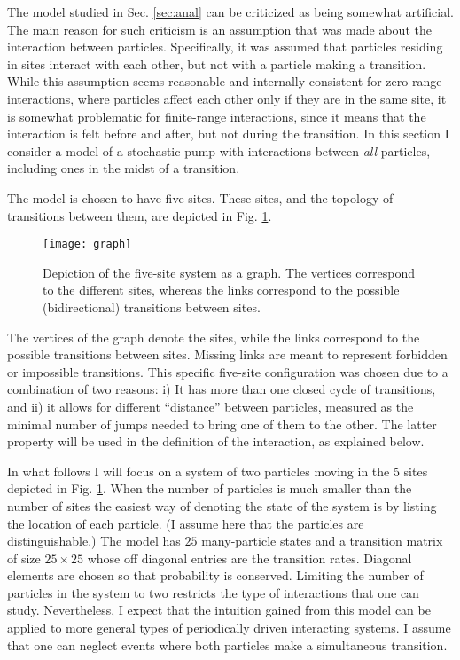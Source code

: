 \documentclass[aps,pre,showpacs,amsmath,amssymb,amsfonts,superscriptaddress,onecolumn,longbibliography]{revtex4-1}
\begin{document}
The model studied in Sec. \ref{sec:anal}
can be criticized as being somewhat artificial. The main reason for such criticism is an assumption
that was
made about the interaction between particles. Specifically, it was assumed that particles residing in sites interact with
each other, but not with a particle making a transition. While this assumption seems
 reasonable and internally consistent for zero-range interactions, where particles affect each other only if they are
 in the same site,
 it is somewhat problematic for finite-range interactions, since
 it means that the interaction is felt before and after, but not during the transition.
  In this section
I consider a model of a stochastic pump with interactions between {\em all} particles, including ones in the midst
of a transition.

The model is chosen to have five sites. These sites, and the topology of transitions between them, are depicted in Fig. \ref{fig:graph}.
\begin{figure}
\texttt{[image: graph]}

\caption{Depiction of the five-site system as a graph. The vertices correspond to the different sites, whereas the links correspond to the possible (bidirectional) transitions between sites. \label{fig:graph}}
\end{figure}
The vertices of the graph denote the sites, while the links correspond to the possible transitions between sites. Missing links
are meant to represent forbidden or impossible transitions. This specific five-site configuration was chosen
due to a combination of two reasons: i) It has more than one closed cycle of transitions, and ii) it allows for different ``distance''
between particles, measured as the minimal number of jumps needed to bring one of them to the other. The latter property will be used in the
definition of the interaction, as explained below.

In what follows I will focus on a system of two particles moving in the 5 sites depicted in Fig. \ref{fig:graph}.
When the number of particles is much smaller than the number of sites the easiest way of denoting the
state of the system is by listing the location of each particle. (I assume here that the particles
are distinguishable.)
The model has $25$ many-particle states and a transition matrix of size $25 \times 25$
whose off diagonal entries are the transition rates. Diagonal elements are chosen so that probability is conserved.
Limiting the number of particles in the system to two restricts the type of interactions that one can study.
Nevertheless, I expect that the intuition gained from this model can be applied to more general types of periodically
driven interacting systems. I assume that one can neglect events where both particles make a simultaneous transition.
\end{document}
